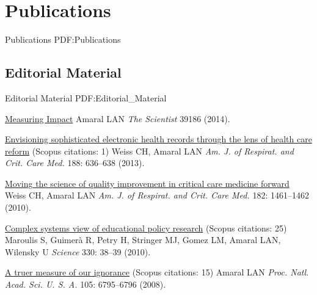 \section
{Publications}
{Publications}
{PDF:Publications}

\subsection
{Editorial Material}
{Editorial Material}
{PDF:Editorial_Material}

\GapNoBreak
\NumberedItem{\makebox[0.8cm][r]{[11]}}
\href{False}
{Measuring Impact}
\newline
Amaral LAN
\newline
\textit{The Scientist}
39186 (2014).
\newline
\Gap
~
\Gap

\NumberedItem{\makebox[0.8cm][r]{[10]}}
\href{/people/amaral/envisioning-sophisticated-electronic-health-records-through-lens-health-care-reform}
{Envisioning sophisticated electronic health records through the lens of health care reform}
    (Scopus citations: 1)
\newline
Weiss CH, Amaral LAN
\newline
\textit{Am. J. of Respirat. and Crit. Care Med.}
    188:
636--638 (2013).
\newline
\Gap
~
\Gap

\NumberedItem{\makebox[0.8cm][r]{[9]}}
\href{False}
{Moving the science of quality improvement in critical care medicine forward}
\newline
Weiss CH, Amaral LAN
\newline
\textit{Am. J. of Respirat. and Crit. Care Med.}
    182:
1461--1462  (2010).
\newline
\Gap
~
\Gap

\NumberedItem{\makebox[0.8cm][r]{[8]}}
\href{/people/amaral/complex-systems-view-educational-policy-research}
{Complex systems view of educational policy research}
    (Scopus citations: 25)
\newline
Maroulis S, Guimer\`a R, Petry H, Stringer MJ, Gomez LM, Amaral LAN, Wilensky U
\newline
\textit{Science}
    330:
38--39 (2010).
\newline
\Gap
~
\Gap

\NumberedItem{\makebox[0.8cm][r]{[7]}}
\href{/people/amaral/a-truer-measure-of-our-ignorance}
{A truer measure of our ignorance}
    (Scopus citations: 15)
\newline
Amaral LAN
\newline
\textit{Proc. Natl. Acad. Sci. U. S. A.}
    105:
6795--6796 (2008).
\newline
\Gap
~
\Gap

